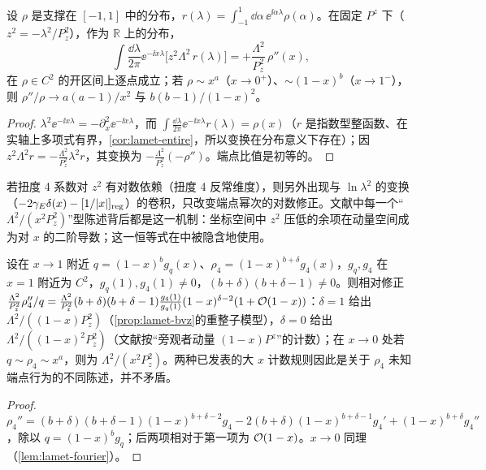 \begin{lemma}\label{lem:lamet-fourier}
设 $\rho$ 是支撑在 $[-1,1]$ 中的分布，$r(\lambda)=\int_{-1}^1\dd\alpha\,\ee^{\ii\alpha\lambda}\rho(\alpha)$。在固定 $P^z$ 下（$z^2=-\lambda^2/P_z^2$），作为 $\mathbb R$ 上的分布，
\begin{equation}\label{eq:lamet-fourier-lemma}
\int\frac{\dd\lambda}{2\pi}\ee^{-\ii x\lambda}\big[z^2\Lambda^2\,r(\lambda)\big]=+\frac{\Lambda^2}{P_z^2}\,\rho''(x),
\end{equation}%
在 $\rho\in C^2$ 的开区间上逐点成立；若 $\rho\sim x^a$（$x\to0^+$）、$\sim(1-x)^b$（$x\to1^-$），则 $\rho''/\rho\to a(a-1)/x^2$ 与 $b(b-1)/(1-x)^2$。
\end{lemma}

\begin{proof}
$\lambda^2\ee^{-\ii x\lambda}=-\partial_x^2\ee^{-\ii x\lambda}$，而 $\int\frac{\dd\lambda}{2\pi}\ee^{-\ii x\lambda}r(\lambda)=\rho(x)$（$r$ 是指数型整函数、在实轴上多项式有界，\cref{cor:lamet-entire}，所以变换在分布意义下存在）；因 $z^2\Lambda^2r=-\frac{\Lambda^2}{P_z^2}\lambda^2r$，其变换为 $-\frac{\Lambda^2}{P_z^2}(-\rho'')$。端点比值是初等的。
\end{proof}

若扭度 4 系数对 $z^2$ 有对数依赖（扭度 4 反常维度），则另外出现与 $\ln\lambda^2$ 的变换（$-2\gamma_E\delta(x)-[1/|x|]_{\rm reg}$）的卷积，只改变端点幂次的对数修正。文献中每一个“$\Lambda^2/(x^2P_z^2)$”型陈述背后都是这一机制：坐标空间中 $z^2$ 压低的余项在动量空间成为对 $x$ 的二阶导数；这一恒等式在\cite{Braun:2018brg}中被隐含地使用。

\begin{corollary}[端点二分]\label{cor:lamet-endpoint}
设在 $x\to1$ 附近 $q=(1-x)^bg_q(x)$、$\rho_4=(1-x)^{b+\delta}g_4(x)$，$g_q,g_4$ 在 $x=1$ 附近为 $C^2$，$g_q(1),g_4(1)\neq0$，$(b+\delta)(b+\delta-1)\neq0$。则相对修正 $\frac{\Lambda^2}{P_z^2}\rho_4''/q=\frac{\Lambda^2}{P_z^2}(b+\delta)(b+\delta-1)\frac{g_4(1)}{g_q(1)}(1-x)^{\delta-2}(1+\mathcal{O}\!\left(1-x\right))$：$\delta=1$ 给出 $\Lambda^2/((1-x)P_z^2)$（\cref{prop:lamet-bvz}的重整子模型），$\delta=0$ 给出 $\Lambda^2/((1-x)^2P_z^2)$（文献\cite{JiEtAl2021}按“旁观者动量 $(1-x)P^z$”的计数）；在 $x\to0$ 处若 $q\sim\rho_4\sim x^a$，则为 $\Lambda^2/(x^2P_z^2)$。两种已发表的大 $x$ 计数规则因此是关于 $\rho_4$ 未知端点行为的不同陈述，并不矛盾。%
\end{corollary}

\begin{proof}
$\rho_4''=(b+\delta)(b+\delta-1)(1-x)^{b+\delta-2}g_4-2(b+\delta)(1-x)^{b+\delta-1}g_4'+(1-x)^{b+\delta}g_4''$，除以 $q=(1-x)^bg_q$；后两项相对于第一项为 $\mathcal{O}\!\left(1-x\right)$。$x\to0$ 同理（\cref{lem:lamet-fourier}）。
\end{proof}


